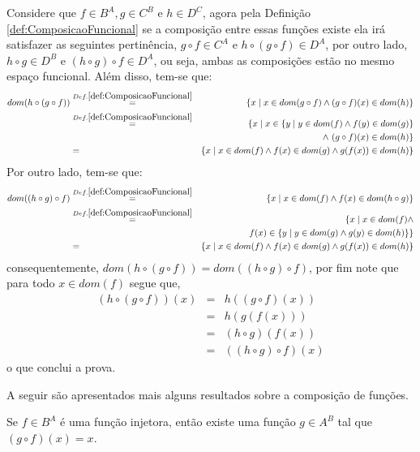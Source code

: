\begin{prova}
  Considere que $f \in B^A, g \in C^B$ e $h \in D^C$, agora pela Definição \ref{def:ComposicaoFuncional} se a composição entre essas funções existe ela irá satisfazer as seguintes pertinência, $g \circ f \in C^A$ e $h \circ (g \circ f) \in D^A$, por outro lado, $h \circ g \in D^B$ e $(h \circ g) \circ f \in D^A$, ou seja, ambas as composições estão no mesmo espaço funcional. Além disso, tem-se que:
	\begin{eqnarray*}
		dom(h \circ (g \circ f)) & \stackrel{Def. \ref{def:ComposicaoFuncional}}{=} & \{x \mid x \in dom(g \circ f) \land (g \circ f)(x) \in dom(h)\}\\
		& \stackrel{Def. \ref{def:ComposicaoFuncional}}{=} & \{x \mid x \in \{y \mid y \in dom(f) \land f(y) \in dom(g)\}\\ 
		& & \land \ (g \circ f)(x) \in dom(h)\}\\
		& = & \{x \mid x \in dom(f) \land f(x) \in dom(g) \land g(f(x)) \in dom(h)\}
	\end{eqnarray*}
	Por outro lado, tem-se que:
	\begin{eqnarray*}
		dom((h \circ g) \circ f) & \stackrel{Def. \ref{def:ComposicaoFuncional}}{=} & \{x \mid x \in dom(f) \land f(x) \in dom(h \circ g)\}\\
		& \stackrel{Def. \ref{def:ComposicaoFuncional}}{=} & \{x \mid x \in dom(f) \land\\ 
		& & f(x) \in \{y \mid y \in dom(g) \land g(y) \in dom(h)\} \}\\
		& = & \{x \mid x \in dom(f) \land f(x) \in dom(g) \land g(f(x)) \in dom(h)\}
	\end{eqnarray*}
	consequentemente, $dom(h \circ (g \circ f)) = dom((h \circ g) \circ f)$, por fim note que para todo $x \in dom(f)$ segue que,
	\begin{eqnarray*}
		(h \circ (g \circ f))(x) & = & h( (g \circ f)(x))\\
		& = & h(g(f(x)))\\
		& = & (h \circ g)(f(x))\\
		& = & ((h \circ g) \circ f)(x)
	\end{eqnarray*}
	o que conclui a prova.
\end{prova}

A seguir são apresentados mais alguns resultados sobre a composição de funções.

\begin{teorema}\label{teo:InversaEsquerda}
	Se $f \in B^A$ é uma função injetora, então existe uma função $g \in A^B$ tal que $(g \circ f)(x) = x$.
\end{teorema}


